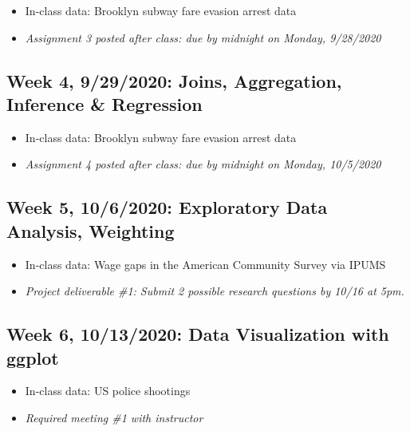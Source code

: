 \documentclass[11pt,]{article}
\providecommand{\tightlist}{%
  \setlength{\itemsep}{0pt}\setlength{\parskip}{0pt}}
\begin{document}
\begin{itemize}
\tightlist
\item
  In-class data: Brooklyn subway fare evasion arrest data
\item
  \emph{Assignment 3 posted after class: due by midnight on Monday,
  9/28/2020} \medskip
\end{itemize}

\hypertarget{week-4-9292020-joins-aggregation-inference-regression}{%
\subsection{Week 4, 9/29/2020: Joins, Aggregation, Inference \&
Regression}\label{week-4-9292020-joins-aggregation-inference-regression}}

\begin{itemize}
\tightlist
\item
  In-class data: Brooklyn subway fare evasion arrest data
\item
  \emph{Assignment 4 posted after class: due by midnight on Monday,
  10/5/2020} \medskip
\end{itemize}

\hypertarget{week-5-1062020-exploratory-data-analysis-weighting}{%
\subsection{Week 5, 10/6/2020: Exploratory Data Analysis,
Weighting}\label{week-5-1062020-exploratory-data-analysis-weighting}}

\begin{itemize}
\tightlist
\item
  In-class data: Wage gaps in the American Community Survey via IPUMS
\item
  \emph{Project deliverable \#1: Submit 2 possible research questions by
  10/16 at 5pm.} \medskip
\end{itemize}

\hypertarget{week-6-10132020-data-visualization-with-ggplot}{%
\subsection{Week 6, 10/13/2020: Data Visualization with
ggplot}\label{week-6-10132020-data-visualization-with-ggplot}}

\begin{itemize}
\tightlist
\item
  In-class data: US police shootings
\item
  \emph{Required meeting \#1 with instructor} \medskip
\end{itemize}
\end{document}
